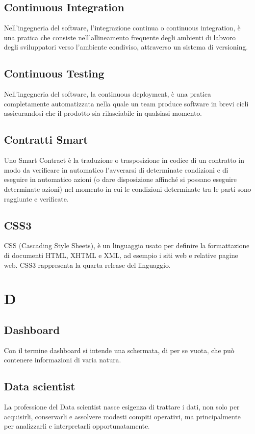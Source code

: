 \subsection{Continuous Integration}  Nell'ingegneria del software, l'integrazione continua o continuous integration, è una pratica che consiste nell'allineamento frequente degli ambienti di labvoro degli sviluppatori verso l'ambiente condiviso, attraverso un sistema di versioning.
\subsection{Continuous Testing}  Nell'ingegneria del software, la continuous deployment, è una pratica completamente automatizzata nella quale un team produce software in brevi cicli assicurandosi che il prodotto sia rilasciabile in qualsiasi momento.
\subsection{Contratti Smart}  Uno Smart Contract è la traduzione o trasposizione in codice di un contratto in modo da verificare in automatico l’avverarsi di determinate condizioni e di eseguire in automatico azioni (o dare disposizione affinché si possano eseguire determinate azioni) nel momento in cui le condizioni determinate tra le parti sono raggiunte e verificate.
\subsection{CSS3}  CSS (Cascading Style Sheets), è un linguaggio usato per definire la formattazione di documenti HTML, XHTML e XML, ad esempio i siti web e relative pagine web. CSS3 rappresenta la quarta release del linguaggio.


\newpage \section{D}
\subsection{Dashboard}  Con il termine dashboard si intende una schermata, di per se vuota, che può contenere informazioni di varia natura.
\subsection{Data scientist}  La professione del Data scientist nasce esigenza di trattare i dati, non solo per acquisirli, conservarli e assolvere modesti compiti operativi, ma principalmente per analizzarli e interpretarli opportunatamente.
